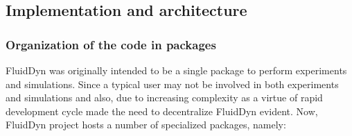 \subsection{Implementation and architecture}


\subsubsection{Organization of the code in packages}

FluidDyn was originally intended to be a single package to perform experiments
and simulations. Since a typical user may not be involved in both experiments
and simulations and also, due to increasing complexity as a virtue of rapid
development cycle made the need to decentralize FluidDyn evident.
Now, FluidDyn project hosts a number of specialized packages, namely:

